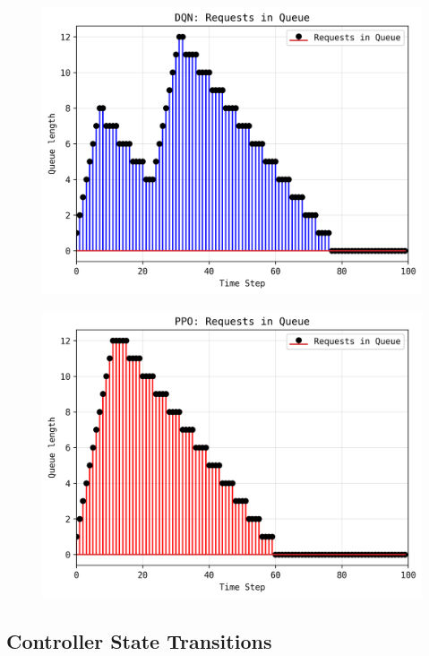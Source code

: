 \documentclass[11pt,a4paper]{article}
\begin{document}
\begin{figure}[b]
\centering
\begin{minipage}{.5\textwidth}
  \centering
  \includegraphics[width=.975\linewidth]{figs/dqn_queue_requests.png}
  \label{fig:dqn_queue_requests}
\end{minipage}%
\begin{minipage}{.5\textwidth}
  \centering
  \includegraphics[width=.975\linewidth]{figs/ppo_queue_requests.png}
  \label{fig:ppo_queue_requests}
\end{minipage}
\end{figure}

\subsection{Controller State Transitions}
\end{document}
